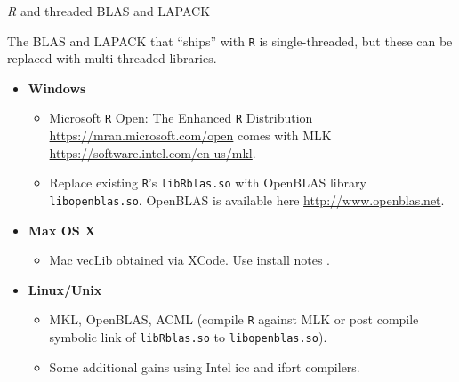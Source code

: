 \begin{frame}
\begin{center}
\emph{R} and threaded BLAS and LAPACK
\end{center}

The BLAS and LAPACK that ``ships'' with \texttt{R} is single-threaded, but these can be replaced with multi-threaded libraries.

\begin{itemize}\setlength{\itemsep}{0.1cm}
\item[]\textbf{Windows}
  \begin{itemize}
  \item Microsoft \texttt{R} Open: The Enhanced \texttt{R} Distribution \url{https://mran.microsoft.com/open} comes with MLK \url{https://software.intel.com/en-us/mkl}.
  \item Replace existing \texttt{R}'s \texttt{libRblas.so} with OpenBLAS library \texttt{libopenblas.so}. OpenBLAS is available here \url{http://www.openblas.net}.
  \end{itemize}
\item[]\textbf{Max OS X}
  \begin{itemize}
  \item Mac vecLib obtained via XCode. Use install notes \href{https://cran.r-project.org/bin/macosx/RMacOSX-FAQ.html\#Which-BLAS-is-used-and-how-can-it-be-changed\_003f}{}. 
  \end{itemize}
\item[]\textbf{Linux/Unix}
  \begin{itemize}
  \item MKL, OpenBLAS, ACML (compile \texttt{R} against MLK or post compile symbolic link of \texttt{libRblas.so} to \texttt{libopenblas.so}).
  \item Some additional gains using Intel icc and ifort compilers.
  \end{itemize}
\end{itemize}
\end{frame}


